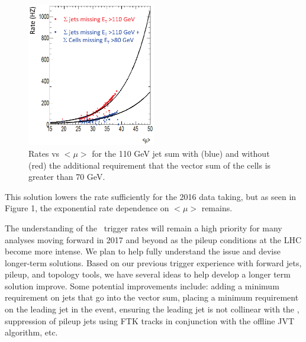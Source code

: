 \begin{figure}[htb]
\centering
\includegraphics[width=0.50\textwidth]{images/met-growth-labc.eps}
\caption[]{Rates vs $<\mu>$ for the 110 GeV jet sum with (blue) and without (red) the additional requirement that the vector sum of the cells is greater than 70 GeV.}
\label{fig:mettrigger}
\end{figure}  


This solution lowers the rate sufficiently for the 2016 data taking, but as seen in Figure 1, the exponential rate dependence on  $<\mu>$ remains.  

The understanding of the \met\ trigger rates will remain a high priority for many analyses moving forward in 2017 and beyond as the pileup conditions at the LHC become more intense.  We plan to help fully understand the issue and devise longer-term solutions.  Based on our previous trigger experience with forward jets, pileup, and topology tools, we have several ideas to help develop a longer term solution improve. Some potential improvements include:   adding a minimum \pt requirement on jets that go into the vector sum, placing a minimum \pt requirement on the leading jet in the event, ensuring the leading jet is not collinear with the \met, suppression of pileup jets using FTK tracks in conjunction with the offline JVT algorithm, etc. 
